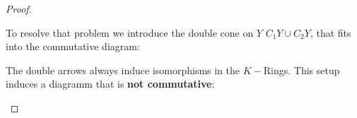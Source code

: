 \begin{proof}
	\begin{center}
	\end{center}
	To resolve that problem we introduce the double cone on $Y$ $C_1Y\cup C_2Y$, that fits into the commutative diagram:
	\begin{center}
	\end{center} The double arrows always induce isomorphisms in the $K-$Rings. 
	This setup induces a diagramm that is \textbf{not commutative}: 
	\begin{center}

\end{center}
\end{proof}
